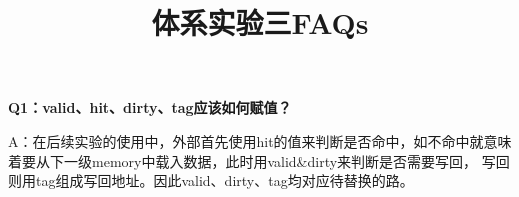 \documentclass{article}
\title{\textbf{体系实验三FAQs}\vspace{-2em}}
\author{}
\date{}
\begin{document}
\maketitle

\textbf{Q1：valid、hit、dirty、tag应该如何赋值？}

A：在后续实验的使用中，外部首先使用hit的值来判断是否命中，如不命中就意味着要从下一级memory中载入数据，此时用valid\&dirty来判断是否需要写回，
写回则用tag组成写回地址。因此valid、dirty、tag均对应待替换的路。
\end{document}
